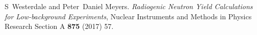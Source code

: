 \documentclass[a4paper,11pt]{article}
\begin{document}
\begin{thebibliography}{99}
S~Westerdale and Peter~Daniel Meyers.
\newblock \emph{Radiogenic Neutron Yield Calculations for Low-background Experiments},
Nuclear Instruments and Methods in Physics Research Section A {\bf 875} (2017) 57.
  




\end{thebibliography}
\end{document}
